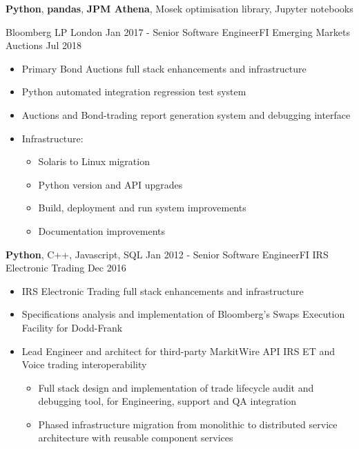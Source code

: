 \begin{experiences}
{\begin{itemize}
        \end{itemize}
       }
       {\textbf{Python}, \textbf{pandas}, \textbf{JPM Athena}, Mosek optimisation library, Jupyter notebooks}

  \topofexperience
  	{Bloomberg LP} {London}
  \experience
    {Jan 2017 -}   {Senior Software Engineer}{FI Emerging Markets Auctions}
    {Jul 2018} {
                \begin{itemize}
                \item Primary Bond Auctions full stack enhancements and infrastructure
                \item Python automated integration regression test system
                \item Auctions and Bond-trading report generation system and debugging interface
                \item Infrastructure:
                \begin{itemize}
                \item Solaris to Linux migration
                \item Python version and API upgrades
                \item Build, deployment and run system improvements
                \item Documentation improvements
                \end{itemize}
                \end{itemize}
               }
               {\textbf{Python}, C++, Javascript, SQL}
  \experience
    {Jan 2012 -}   {Senior Software Engineer}{FI IRS Electronic Trading}
    {Dec 2016} {
                \begin{itemize}
                \item IRS Electronic Trading full stack enhancements and infrastructure
                \item Specifications analysis and implementation of Bloomberg's Swaps Execution Facility for Dodd-Frank
                \item Lead Engineer and architect for third-party MarkitWire API IRS ET and Voice trading interoperability
                \begin{itemize}
                \setlength\itemsep{0em}
                \item Full stack design and implementation of trade lifecycle audit and debugging tool, for Engineering, support and QA integration
                \item Phased infrastructure migration from monolithic to distributed service architecture with reusable component services

\end{itemize}
\end{itemize}}
\end{experiences}
